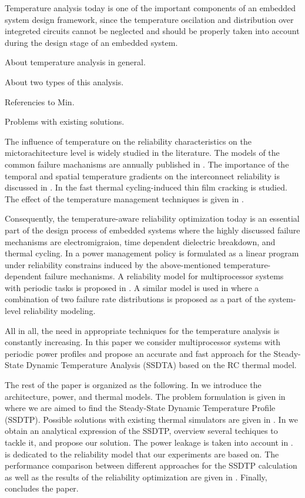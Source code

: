 Temperature analysis today is one of the important components of an embedded system design framework, since the temperature oscilation and distribution over integreted circuits cannot be neglected and should be properly taken into account during the design stage of an embedded system.

About temperature analysis in general.

About two types of this analysis.

Referencies to Min.

Problems with existing solutions.

The influence of temperature on the reliability characteristics on the mictorachitecture level is widely studied in the literature. The models of the common failure machanisms are annually published in \cite{jedec2010}. The importance of the temporal and spatial temperature gradients on the interconnect reliability is discussed in \cite{lu2004}. In \cite{hieu2004} the fast thermal cycling-induced thin film cracking is studied. The effect of the temperature management techniques is given in \cite{srinivasan2003}.

Consequently, the temperature-aware reliability optimization today is an essential part of the design process of embedded systems where the highly discussed failure mechanisms are electromigraion, time dependent dielectric breakdown, and thermal cycling. In \cite{coskun2006} a power management policy is formulated as a linear program under reliability constrains induced by the above-mentioned temperature-dependent failure mechanisms. A reliability model for multiprocessor systems with periodic tasks is proposed in \cite{huang2009}. A similar model is used in \cite{xiang2010} where a combination of two failure rate distributions is proposed as a part of the system-level reliability modeling.

All in all, the need in appropriate techniques for the temperature analysis is constantly increasing. In this paper we consider multiprocessor systems with periodic power profiles and propose an accurate and fast approach for the Steady-State Dynamic Temperature Analysis (SSDTA) based on the RC thermal model.

The rest of the paper is organized as the following. In  we introduce the architecture, power, and thermal models. The problem formulation is given in  where we are aimed to find the Steady-State Dynamic Temperature Profile (SSDTP). Possible solutions with existing thermal simulators are given in . In  we obtain an analytical expression of the SSDTP, overview several techiques to tackle it, and propose our solution. The power leakage is taken into account in .  is dedicated to the reliability model that our experiments are based on. The performance comparison between different approaches for the SSDTP calculation as well as the results of the reliability optimization are given in . Finally,  concludes the paper.
